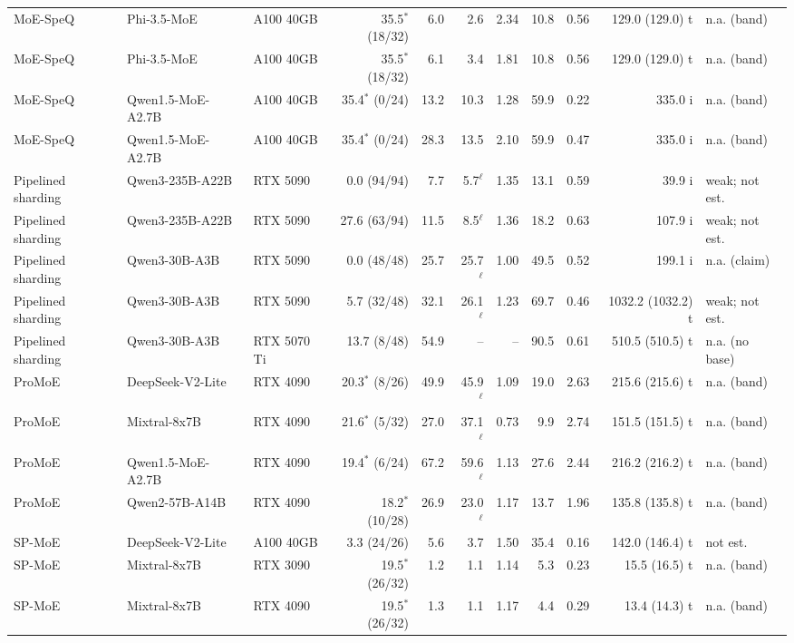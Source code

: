 {\begin{longtable}{p{2.2cm}p{2.1cm}p{1.5cm}rrrrrrrl}
MoE-SpeQ & Phi-3.5-MoE & A100 40GB & 35.5$^\ast$ (18/32) & 6.0 & 2.6 & 2.34 & 10.8 & 0.56 & 129.0 (129.0) t & n.a. (band) \\
MoE-SpeQ & Phi-3.5-MoE & A100 40GB & 35.5$^\ast$ (18/32) & 6.1 & 3.4 & 1.81 & 10.8 & 0.56 & 129.0 (129.0) t & n.a. (band) \\
MoE-SpeQ & Qwen1.5-MoE-A2.7B & A100 40GB & 35.4$^\ast$ (0/24) & 13.2 & 10.3 & 1.28 & 59.9 & 0.22 & 335.0 i & n.a. (band) \\
MoE-SpeQ & Qwen1.5-MoE-A2.7B & A100 40GB & 35.4$^\ast$ (0/24) & 28.3 & 13.5 & 2.10 & 59.9 & 0.47 & 335.0 i & n.a. (band) \\
Pipelined sharding & Qwen3-235B-A22B & RTX 5090 & 0.0 (94/94) & 7.7 & 5.7$^\ell$ & 1.35 & 13.1 & 0.59 & 39.9 i & weak; not est. \\
Pipelined sharding & Qwen3-235B-A22B & RTX 5090 & 27.6 (63/94) & 11.5 & 8.5$^\ell$ & 1.36 & 18.2 & 0.63 & 107.9 i & weak; not est. \\
Pipelined sharding & Qwen3-30B-A3B & RTX 5090 & 0.0 (48/48) & 25.7 & 25.7$^\ell$ & 1.00 & 49.5 & 0.52 & 199.1 i & n.a. (claim) \\
Pipelined sharding & Qwen3-30B-A3B & RTX 5090 & 5.7 (32/48) & 32.1 & 26.1$^\ell$ & 1.23 & 69.7 & 0.46 & 1032.2 (1032.2) t & weak; not est. \\
Pipelined sharding & Qwen3-30B-A3B & RTX 5070 Ti & 13.7 (8/48) & 54.9 & -- & -- & 90.5 & 0.61 & 510.5 (510.5) t & n.a. (no base) \\
ProMoE & DeepSeek-V2-Lite & RTX 4090 & 20.3$^\ast$ (8/26) & 49.9 & 45.9$^\ell$ & 1.09 & 19.0 & 2.63 & 215.6 (215.6) t & n.a. (band) \\
ProMoE & Mixtral-8x7B & RTX 4090 & 21.6$^\ast$ (5/32) & 27.0 & 37.1$^\ell$ & 0.73 & 9.9 & 2.74 & 151.5 (151.5) t & n.a. (band) \\
ProMoE & Qwen1.5-MoE-A2.7B & RTX 4090 & 19.4$^\ast$ (6/24) & 67.2 & 59.6$^\ell$ & 1.13 & 27.6 & 2.44 & 216.2 (216.2) t & n.a. (band) \\
ProMoE & Qwen2-57B-A14B & RTX 4090 & 18.2$^\ast$ (10/28) & 26.9 & 23.0$^\ell$ & 1.17 & 13.7 & 1.96 & 135.8 (135.8) t & n.a. (band) \\
SP-MoE & DeepSeek-V2-Lite & A100 40GB & 3.3 (24/26) & 5.6 & 3.7 & 1.50 & 35.4 & 0.16 & 142.0 (146.4) t & not est. \\
SP-MoE & Mixtral-8x7B & RTX 3090 & 19.5$^\ast$ (26/32) & 1.2 & 1.1 & 1.14 & 5.3 & 0.23 & 15.5 (16.5) t & n.a. (band) \\
SP-MoE & Mixtral-8x7B & RTX 4090 & 19.5$^\ast$ (26/32) & 1.3 & 1.1 & 1.17 & 4.4 & 0.29 & 13.4 (14.3) t & n.a. (band) \\

\end{longtable}}
